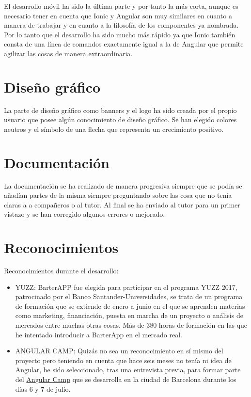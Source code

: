    El desarrollo móvil ha sido la última parte y por tanto la más corta, aunque es necesario tener en cuenta que Ionic y Angular son muy similares en cuanto a manera de trabajar y en cuanto a la filosofía de los componentes ya nombrada. Por lo tanto que el desarrollo ha sido mucho más rápido ya que Ionic también consta de una línea de comandos exactamente igual a la de Angular que permite agilizar las cosas de manera extraordinaria.
   
   \section{Diseño gráfico}\label{grafico}
   La parte de diseño gráfico como banners y el logo ha sido creada por el propio usuario que posee algún conocimiento de diseño gráfico. Se han elegido colores neutros y el símbolo de una flecha  que representa un crecimiento positivo.
   
   
   \section{Documentación}\label{docs}
   
   La documentación se ha realizado de manera progresiva siempre que se podía se añadían partes de la misma siempre preguntando sobre las cosa que no tenía claras a a compañeros o al tutor.  Al final se ha enviado al tutor para un primer vistazo y se han corregido algunos errores o mejorado.
   

   
   \section{Reconocimientos}\label{reconocimientos}
   
   Reconocimientos durante el desarrollo:
   
   \begin{itemize}
	\item YUZZ: BarterAPP fue elegida para participar en el programa YUZZ 2017, patrocinado por el Banco Santander-Universidades, se trata de un programa de formación que se extiende de enero a junio en el que se aprenden materias como marketing, financiación, puesta en marcha de un proyecto o análisis de mercados entre muchas otras cosas. Más de 380 horas de formación en las que he intentado introducir a BarterApp en el mercado real.
	\item ANGULAR CAMP: Quizás no sea un reconocimiento en sí mismo del proyecto pero teniendo en cuenta que hace seis meses no tenía ni idea de Angular, he sido seleccionado, tras una entrevista previa, para formar parte del  \href{https://angularcamp.org/}{Angular Camp} que se desarrolla en la ciudad de Barcelona durante los días 6 y 7 de julio.
\end{itemize}



